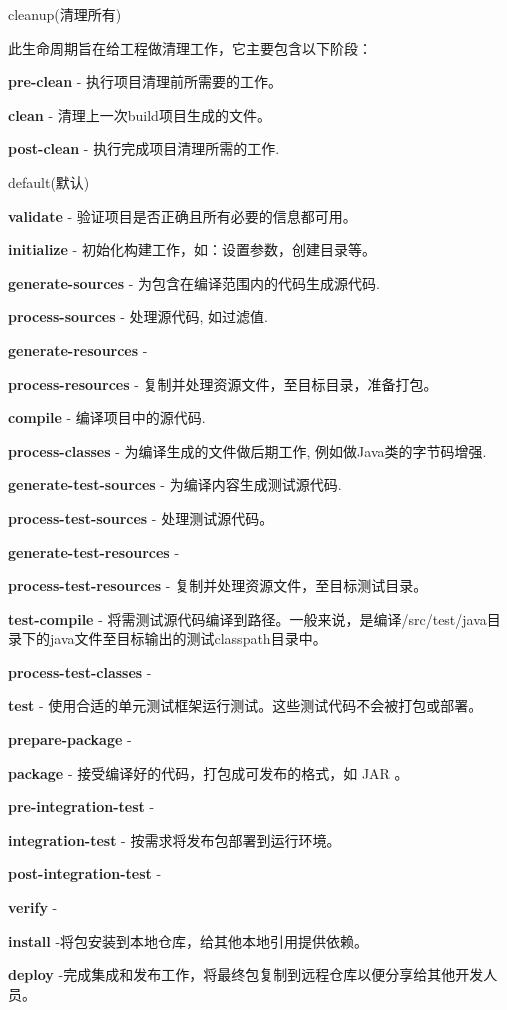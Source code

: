 \documentclass[
]{article}
\begin{document}
cleanup(清理所有)

此生命周期旨在给工程做清理工作，它主要包含以下阶段：

\textbf{pre-clean} - 执行项目清理前所需要的工作。

\textbf{clean} - 清理上一次build项目生成的文件。

\textbf{post-clean} - 执行完成项目清理所需的工作.

default(默认)

\textbf{validate} - 验证项目是否正确且所有必要的信息都可用。

\textbf{initialize} - 初始化构建工作，如：设置参数，创建目录等。

\textbf{generate-sources} - 为包含在编译范围内的代码生成源代码.

\textbf{process-sources} - 处理源代码, 如过滤值.

\textbf{generate-resources} -

\textbf{process-resources} - 复制并处理资源文件，至目标目录，准备打包。

\textbf{compile} - 编译项目中的源代码.

\textbf{process-classes} - 为编译生成的文件做后期工作,
例如做Java类的字节码增强.

\textbf{generate-test-sources} - 为编译内容生成测试源代码.

\textbf{process-test-sources} - 处理测试源代码。

\textbf{generate-test-resources} -

\textbf{process-test-resources} - 复制并处理资源文件，至目标测试目录。

\textbf{test-compile} -
将需测试源代码编译到路径。一般来说，是编译/src/test/java目录下的java文件至目标输出的测试classpath目录中。

\textbf{process-test-classes} -

\textbf{test} -
使用合适的单元测试框架运行测试。这些测试代码不会被打包或部署。

\textbf{prepare-package} -

\textbf{package} - 接受编译好的代码，打包成可发布的格式，如 JAR 。

\textbf{pre-integration-test} -

\textbf{integration-test} - 按需求将发布包部署到运行环境。

\textbf{post-integration-test} -

\textbf{verify} -

\textbf{install} -将包安装到本地仓库，给其他本地引用提供依赖。

\textbf{deploy}
-完成集成和发布工作，将最终包复制到远程仓库以便分享给其他开发人员。
\end{document}
